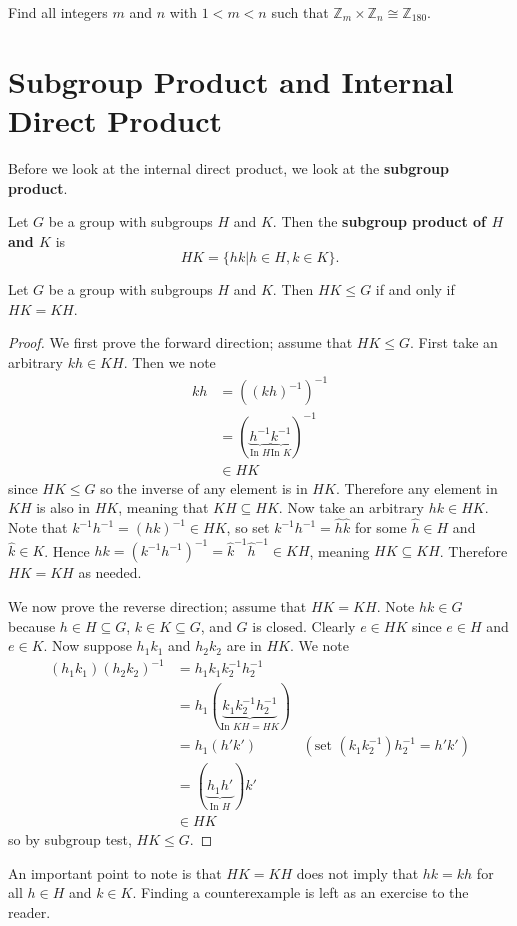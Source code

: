 \begin{exercise}
    Find all integers $m$ and $n$ with $1 < m < n$ such that $\mathbb{Z}_m \times \mathbb{Z}_n \cong \mathbb{Z}_{180}$.
\end{exercise}

\section{Subgroup Product and Internal Direct Product}
Before we look at the internal direct product, we look at the \textbf{subgroup product}.
\begin{definition}
    Let $G$ be a group with subgroups $H$ and $K$. Then the \textbf{subgroup product of $H$ and $K$} is
    \[
        HK = \{hk \vert h \in H, k \in K\}.
    \]
\end{definition}

\begin{proposition}\label{prop-subgroup-product-is-subgroup}
    Let $G$ be a group with subgroups $H$ and $K$. Then $HK \leq G$ if and only if $HK = KH$.
\end{proposition}
\begin{proof}
    We first prove the forward direction; assume that $HK \leq G$. First take an arbitrary $kh \in KH$. Then we note
    \begin{align*}
        kh &= \left(\left(kh\right)^{-1}\right)^{-1}\\
        &= (\underbrace{h^{-1}}_{\text{In } H}\underbrace{k^{-1}}_{\text{In } K})^{-1}\\
        &\in HK
    \end{align*}
    since $HK \leq G$ so the inverse of any element is in $HK$. Therefore any element in $KH$ is also in $HK$, meaning that $KH \subseteq HK$. Now take an arbitrary $hk \in HK$. Note that $k^{-1}h^{-1} = (hk)^{-1} \in HK$, so set $k^{-1}h^{-1} = \hat{h}\hat{k}$ for some $\hat{h} \in H$ and $\hat{k} \in K$. Hence $hk = \left(k^{-1}h^{-1}\right)^{-1} = \hat{k}^{-1}\hat{h}^{-1} \in KH$, meaning $HK \subseteq KH$. Therefore $HK = KH$ as needed.

    We now prove the reverse direction; assume that $HK = KH$. Note $hk \in G$ because $h \in H \subseteq G$, $k \in K \subseteq G$, and $G$ is closed. Clearly $e \in HK$ since $e \in H$ and $e \in K$. Now suppose $h_1k_1$ and $h_2k_2$ are in $HK$. We note
    \begin{align*}
        (h_1k_1)(h_2k_2)^{-1} &= h_1k_1k_2^{-1}h_2^{-1}\\
        &= h_1(\underbrace{k_1k_2^{-1}h_2^{-1}}_{\text{In } KH = HK})\\
        &= h_1(h'k') & (\text{set }(k_1k_2^{-1})h_2^{-1} = h'k')\\
        &= (\underbrace{h_1h'}_{\text{In } H})k'\\
        &\in HK
    \end{align*}
    so by subgroup test, $HK \leq G$.
\end{proof}
\begin{remark}
    An important point to note is that $HK = KH$ does not imply that $hk = kh$ for all $h \in H$ and $k \in K$. Finding a counterexample is left as an exercise to the reader.
\end{remark}

